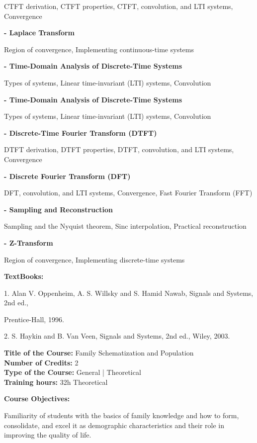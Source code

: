 \documentclass[12pt,a4paper]{article}
\begin{document}
CTFT derivation, CTFT properties, CTFT, convolution, and LTI systems, Convergence\par
\vspace{2pt}\textbf{- Laplace Transform}\par
Region of convergence, Implementing continuous-time systems\par
\vspace{2pt}\textbf{- Time-Domain Analysis of Discrete-Time Systems}\par
Types of systems, Linear time-invariant (LTI) systems, Convolution\par
\vspace{2pt}\textbf{- Time-Domain Analysis of Discrete-Time Systems}\par
Types of systems, Linear time-invariant (LTI) systems, Convolution\par
\vspace{2pt}\textbf{- Discrete-Time Fourier Transform (DTFT)}\par
DTFT derivation, DTFT properties, DTFT, convolution, and LTI systems, Convergence\par
\vspace{2pt}\textbf{- Discrete Fourier Transform (DFT)}\par
DFT, convolution, and LTI systems, Convergence, Fast Fourier Transform (FFT)\par
\vspace{2pt}\textbf{- Sampling and Reconstruction}\par
Sampling and the Nyquist theorem, Sinc interpolation, Practical reconstruction\par
\vspace{2pt}\textbf{- Z-Transform}\par
Region of convergence, Implementing discrete-time systems\par\vspace{4pt}
\textbf{TextBooks:}\par\vspace{2pt}
1. Alan V. Oppenheim, A. S. Willsky and S. Hamid Nawab, Signals and Systems, 2nd ed.,\par
Prentice-Hall, 1996.\par
2. S. Haykin and B. Van Veen, Signals and Systems, 2nd ed., Wiley, 2003.\par
\vspace{4pt}

\newpage
\nopagebreak
\textbf{Title of the Course:} Family Schematization and Population\\
\textbf{Number of Credits:} 2\\
\textbf{Type of the Course:} General | Theoretical\\
\textbf{Training hours:} 32h Theoretical\par\vspace{4pt}
\textbf{Course Objectives:}\par\vspace{2pt}
Familiarity of students with the basics of family knowledge and how to form, consolidate, and
excel it as demographic characteristics and their role in improving the quality of life.\par\vspace{4pt}
\end{document}
